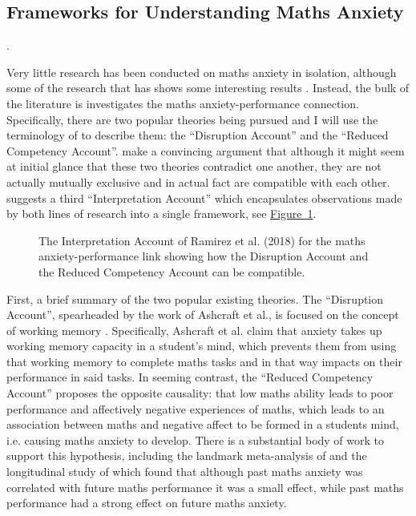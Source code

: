 \documentclass[twoside,12pt,a4paper]{report}
\newcommand{\reffig}[1]{\hyperref[fig:#1]{Figure~\ref{fig:#1}}}
\begin{document}
\subsection*{Frameworks for Understanding Maths Anxiety}.

Very little research has been conducted on maths anxiety in isolation, although some of the research that has shows some interesting results \cite{Young2012, Lyons2012pain}. Instead, the bulk of the literature is investigates the maths anxiety-performance connection.  Specifically, there are two popular theories being pursued and I will use the terminology of  to describe them: the ``Disruption Account'' and the ``Reduced Competency Account''.  make a convincing argument that although it might seem at initial glance that these two theories contradict one another, they are not actually mutually exclusive and in actual fact are compatible with each other.  suggests a third ``Interpretation Account'' which encapsulates observations made by both lines of research into a single framework, see \reffig{ramirez}.

\begin{figure}
\begin{center}

\caption{The Interpretation Account of 
Ramirez et al. (2018)
for the maths anxiety-performance link showing how the Disruption Account and the Reduced Competency Account can be compatible.
\label{fig:ramirez}
}
\end{center}
\end{figure}

First, a brief summary of the two popular existing theories. The ``Disruption Account'', spearheaded by the work of Ashcraft et al., is focused on the concept of working memory \cite{Ashcraft2001, Ashcraft2007}. Specifically, Ashcraft et al. claim that anxiety takes up working memory capacity in a student's mind, which prevents them from using that working memory to complete maths tasks and in that way impacts on their performance in said tasks. In seeming contrast, the ``Reduced Competency Account'' proposes the opposite causality: that low maths ability leads to poor performance and affectively negative experiences of maths, which leads to an association between maths and negative affect to be formed in a students mind, i.e. causing maths anxiety to develop. There is a substantial body of work to support this hypothesis, including the landmark meta-analysis of  and the longitudinal study of  which found that although past maths anxiety was correlated with future maths performance it was a small effect, while past maths performance had a strong effect on future maths anxiety.
\end{document}
